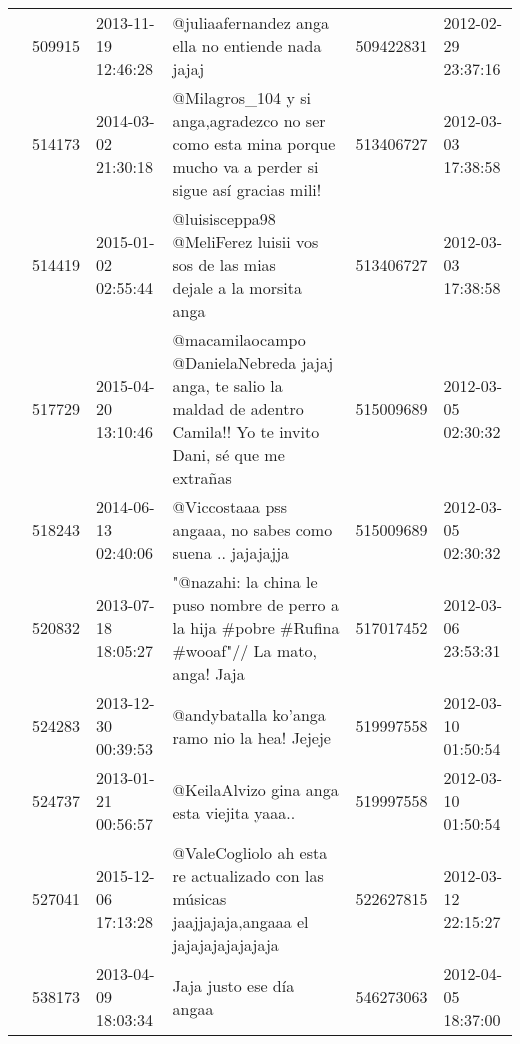 \begin{tabular}{llllrl}
           & 509915  & 2013-11-19 12:46:28 &                                                                                            @juliaafernandez anga ella no entiende nada jajaj &   509422831 & 2012-02-29 23:37:16 \\
           & 514173  & 2014-03-02 21:30:18 &                                  @Milagros\_104 y si anga,agradezco no ser como esta mina porque mucho va a perder si sigue así gracias mili! &   513406727 & 2012-03-03 17:38:58 \\
           & 514419  & 2015-01-02 02:55:44 &                                                            @luisisceppa98 @MeliFerez luisii vos sos de las mias👏👏😏😏 dejale a la morsita anga &   513406727 & 2012-03-03 17:38:58 \\
           & 517729  & 2015-04-20 13:10:46 &                     @macamilaocampo @DanielaNebreda jajaj anga, te salio la maldad de adentro Camila!! Yo te invito Dani, sé que me extrañas &   515009689 & 2012-03-05 02:30:32 \\
           & 518243  & 2014-06-13 02:40:06 &                                                                                     @Viccostaaa pss angaaa, no sabes como suena .. jajajajja &   515009689 & 2012-03-05 02:30:32 \\
           & 520832  & 2013-07-18 18:05:27 &                                            "@nazahi: la china le puso nombre de perro a la hija \#pobre \#Rufina \#wooaf"// La mato, anga! Jaja &   517017452 & 2012-03-06 23:53:31 \\
           & 524283  & 2013-12-30 00:39:53 &                                                                                                 @andybatalla ko'anga ramo nio la hea! Jejeje &   519997558 & 2012-03-10 01:50:54 \\
           & 524737  & 2013-01-21 00:56:57 &                                                                                                   @KeilaAlvizo gina anga esta viejita yaaa.. &   519997558 & 2012-03-10 01:50:54 \\
           & 527041  & 2015-12-06 17:13:28 &                                                   @ValeCogliolo ah esta re actualizado con las músicas jaajjajaja,angaaa el jajajajajajajaja &   522627815 & 2012-03-12 22:15:27 \\
           & 538173  & 2013-04-09 18:03:34 &                                                                                                                     Jaja justo ese día angaa &   546273063 & 2012-04-05 18:37:00 \\

\end{tabular}
